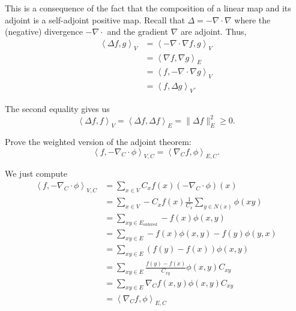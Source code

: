 \documentclass[12 pt, letterpaper]{hmcpset}
\begin{document}
\begin{solution}
	This is a consequence of the fact that the composition of a linear map and its adjoint is a self-adjoint positive map. Recall that $\Delta = - \nabla \cdot \nabla$ where the (negative) divergence $-\nabla \cdot$ and the gradient $\nabla$ are adjoint. Thus,
	\begin{align*}
		\left < \Delta f, g \right >_{V} & = \left < - \nabla \cdot \nabla f, g \right >_{V} \\
						 & = \left < \nabla f, \nabla g \right >_{E} \\
						 & = \left < f, - \nabla \cdot \nabla g \right >_{V} \\
						 & = \left < f, \Delta g \right >_{V}.
	\end{align*}

	The second equality gives us
	\[
		\left < \Delta f, f \right >_{V} = \left < \Delta f, \Delta f \right >_{E} = \lVert \Delta f \rVert_{E}^{2} \ge 0.
	\]
\end{solution}

\pagebreak

\begin{problem}[43.]
	Prove the weighted version of the adjoint theorem:
	\[
		\left < f, - \nabla_{C} \cdot \phi \right >_{V, C} = \left < \nabla_{C} f, \phi \right >_{E, C}.
	\]
\end{problem}

\begin{solution}
	We just compute
	\begin{align*}
		\left < f, - \nabla_{C} \cdot \phi \right >_{V, C} & = \sum_{x \in V} C_{x} f(x) (-\nabla_{C} \cdot \phi)(x) \\
								   & = \sum_{x \in V} - C_{x} f(x) \frac{1}{C_{x}} \sum_{y \in N(x)} \phi(xy) \\
								   & = \sum_{xy \in E_{\text{ordered}}} - f(x) \phi(x, y) \\
								   & = \sum_{xy \in E} -f(x) \phi(x, y) - f(y) \phi(y, x) \\
								   & = \sum_{xy \in E} (f(y) - f(x)) \phi(x, y) \\
								   & = \sum_{xy \in E} \frac{f(y) - f(x)}{C_{xy}} \phi(x, y) C_{xy} \\
								   & = \sum_{xy \in E} \nabla_{C} f(x, y) \phi(x, y) C_{xy} \\
								   & = \left < \nabla_{C} f, \phi \right >_{E, C}
	\end{align*}
\end{solution}
\end{document}
